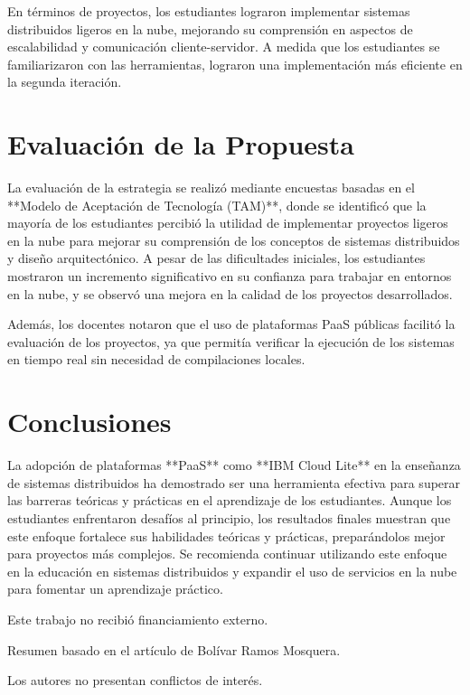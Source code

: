 \documentclass[9pt,twocolumn,twoside]{opticajnl}
\begin{document}
En términos de proyectos, los estudiantes lograron implementar sistemas distribuidos ligeros en la nube, mejorando su comprensión en aspectos de escalabilidad y comunicación cliente-servidor. A medida que los estudiantes se familiarizaron con las herramientas, lograron una implementación más eficiente en la segunda iteración.

\section{Evaluación de la Propuesta}
La evaluación de la estrategia se realizó mediante encuestas basadas en el **Modelo de Aceptación de Tecnología (TAM)**, donde se identificó que la mayoría de los estudiantes percibió la utilidad de implementar proyectos ligeros en la nube para mejorar su comprensión de los conceptos de sistemas distribuidos y diseño arquitectónico. A pesar de las dificultades iniciales, los estudiantes mostraron un incremento significativo en su confianza para trabajar en entornos en la nube, y se observó una mejora en la calidad de los proyectos desarrollados.

Además, los docentes notaron que el uso de plataformas PaaS públicas facilitó la evaluación de los proyectos, ya que permitía verificar la ejecución de los sistemas en tiempo real sin necesidad de compilaciones locales.

\section{Conclusiones}
La adopción de plataformas **PaaS** como **IBM Cloud Lite** en la enseñanza de sistemas distribuidos ha demostrado ser una herramienta efectiva para superar las barreras teóricas y prácticas en el aprendizaje de los estudiantes. Aunque los estudiantes enfrentaron desafíos al principio, los resultados finales muestran que este enfoque fortalece sus habilidades teóricas y prácticas, preparándolos mejor para proyectos más complejos. Se recomienda continuar utilizando este enfoque en la educación en sistemas distribuidos y expandir el uso de servicios en la nube para fomentar un aprendizaje práctico.

\begin{backmatter}
Este trabajo no recibió financiamiento externo.

Resumen basado en el artículo de Bolívar Ramos Mosquera.

Los autores no presentan conflictos de interés.
\end{backmatter}
\end{document}
